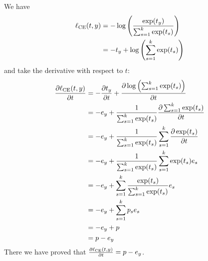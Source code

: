 \begin{answer}
    We have 
    \begin{align*}
        \ell_\textup{CE} (t, y) &= - \log \left(\frac{\exp(t_y)}{\sum_{s=1}^{k} \exp(t_s)}\right) \\
        &= -t_y + \log \left(\sum_{s=1}^{k} \exp(t_s)\right)
    \end{align*}
    and take the derivative with respect to $t$:
    \begin{align*}
        \frac{\partial \ell_\textup{CE} (t, y)}{\partial t} &= -\frac{\partial t_y}{\partial t} + \frac{\partial \log \left(\sum_{s=1}^{k} \exp(t_s)\right)}{\partial t} \\
        &= - e_y + \frac{1}{\sum_{s=1}^{k} \exp(t_s)} \frac{\partial \sum_{s=1}^{k} \exp(t_s)}{\partial t} \\
        &= - e_y + \frac{1}{\sum_{s=1}^{k} \exp(t_s)} \sum_{s=1}^{k} \frac{\partial \exp(t_s)}{\partial t} \\
        &= - e_y + \frac{1}{\sum_{s=1}^{k} \exp(t_s)} \sum_{s=1}^{k} \exp(t_s) e_s \\
        &= - e_y + \sum_{s=1}^{k} \frac{\exp(t_s)}{\sum_{s=1}^{k} \exp(t_s)} e_s \\
        &= - e_y + \sum_{s=1}^{k} p_s e_s \\
        &= - e_y + p \\
        &= p - e_y
    \end{align*}
    There we have proved that $\frac{\partial \ell_\textup{CE} (t, y)}{\partial t} = p - e_y$.
\end{answer}
   
  
